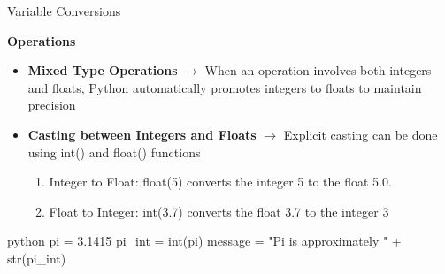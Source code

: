 \documentclass[
	11pt, 
]{beamer}
\begin{document}
\begin{frame}[fragile]{Variable Conversions}
    

\begin{alertblock}{\textbf{Operations}}
    \begin{itemize}
        \item \textbf{Mixed Type Operations}  $\rightarrow$ When an operation involves both integers and floats, Python automatically promotes integers to floats to maintain precision
        \item \textbf{Casting between Integers and Floats} $\rightarrow$ Explicit casting can be done using int() and float() functions \smallskip

        \begin{enumerate}
            \item Integer to Float: float(5) converts the integer 5 to the float 5.0.
            \item Float to Integer: int(3.7) converts the float 3.7 to the integer 3
        \end{enumerate}
    \end{itemize}
\end{alertblock}

\begin{mintedbox}{python}
pi = 3.1415
pi_int = int(pi)
message = "Pi is approximately " + str(pi_int)
\end{mintedbox}

\end{frame}
\end{document}
